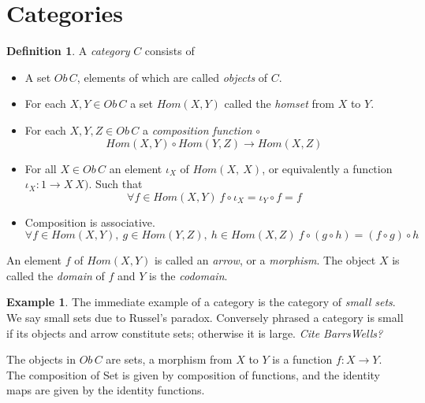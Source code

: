 \documentclass{article}
\theoremstyle{definition}
\newtheorem{definition}{Definition}[section]
\newtheorem{example}{Example}[section]
\begin{document}
\section{Categories}

\begin{definition}
    A \textit{category} $C$ consists of
    \begin{itemize}
        \item A set $Ob\,C$, elements of which are called \textit{objects} of $C$.
        \item For each $X, Y \in Ob\,C$
            a set $Hom(X,Y)$ called the \textit{homset} from $X$ to $Y$.
        \item For each $X, Y, Z \in Ob\,C$ a \textit{composition function} $\circ$
            $$Hom(X,Y) \circ Hom(Y,Z) \rightarrow Hom(X,Z)$$
        \item For all $X \in Ob\,C$ an element $\iota_X$ of $Hom(X,\ X)$,
            or equivalently a function $\iota_X : 1 \rightarrow X\ X)$.
            Such that
            $$\forall f \in Hom(X,Y)\ f \circ \iota_X = \iota_Y \circ f = f$$
        \item Composition is associative.
            $$\forall
              f \in Hom(X,Y),
            \ g \in Hom(Y,Z),
            \ h \in Hom(X,Z)
            \ f \circ (g \circ h) = (f \circ g) \circ h
            $$
    \end{itemize}
\end{definition}

\par
An element $f$ of $Hom(X,Y)$ is called an \textit{arrow},
or a \textit{morphism}. The object $X$ is called the \textit{domain} of $f$ and $Y$ is
the \textit{codomain}.\\

\begin{example}
    The immediate example of a category is the category of \textit{small sets}.
    We say small sets due to Russel's paradox.
    Conversely phrased a category is small
    if its objects and arrow constitute sets; otherwise it is large. \textit{Cite BarrsWells?}

    The objects in $Ob\,C$ are sets,
    a morphism from $X$ to $Y$ is a function $f : X \rightarrow Y$.
    The composition of Set is given by composition of functions,
    and the identity maps are given by the identity functions.
\end{example}
\end{document}
